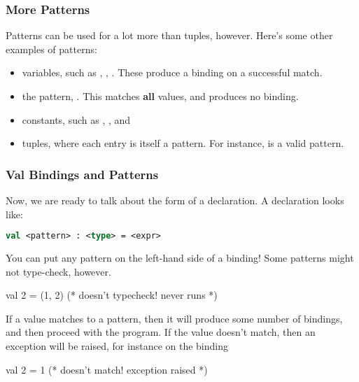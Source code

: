 \documentclass[aspectratio=169, handout]{beamer}
\begin{document}
\begin{frame}[fragile]
  \frametitle{More Patterns}

  Patterns can be used for a lot more than tuples, however. Here's some other examples of patterns:

  \pause
  \vspace{\fill}

  \begin{itemize}
    \item variables, such as , , . These produce a binding on a successful match.
    \item the  pattern, \code{_}. This matches \textbf{all} values, and
    produces no binding.
    \item constants, such as , , and 
    \item tuples, where each entry is itself a pattern. For instance,  is
    a valid pattern.
  \end{itemize}
\end{frame}

\begin{frame}[fragile]
  \frametitle{Val Bindings and Patterns}

  Now, we are ready to talk about the form of a  declaration. A  declaration looks like:

  \vspace{\fill}

  \begin{lstlisting}[style=15150code, numbers=none, language=sml]
    val <pattern> : <type> = <expr>
  \end{lstlisting}

  \pause
  \vspace{\fill}

  You can put any pattern on the left-hand side of a binding! Some patterns might not type-check,
  however.
  \begin{codeblock}
    val 2 = (1, 2) (* doesn't typecheck! never runs *)
  \end{codeblock}

  \pause
  \vspace{\fill}

  If a value matches to a pattern, then it will produce some number of bindings, and then proceed
  with the program. If the value doesn't match, then an exception will be raised, for instance
  on the binding
  \begin{codeblock}
    val 2 = 1 (* doesn't match! exception raised *)
  \end{codeblock}
\end{frame}
\end{document}
